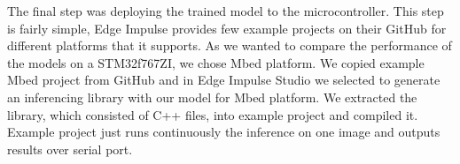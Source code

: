 The final step was deploying the trained model to the microcontroller.
This step is fairly simple, Edge Impulse provides few example projects on their GitHub for different platforms that it supports.
As we wanted to compare the performance of the models on a STM32f767ZI, we chose Mbed platform.
We copied example Mbed project from GitHub and in Edge Impulse Studio we selected to generate an inferencing library with our model for Mbed platform.
We extracted the library, which consisted of C++ files, into example project and compiled it.
Example project just runs continuously the inference on one image and outputs results over serial port.
